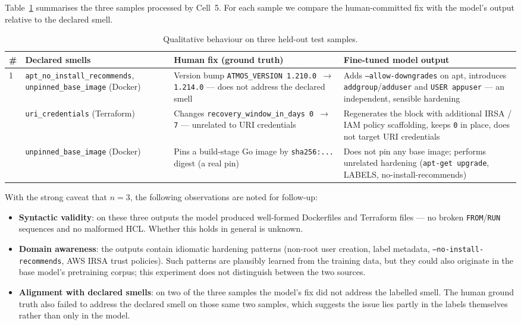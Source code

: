 \documentclass[12pt, a4paper]{report}
\begin{document}
Table~\ref{tab:qualitative} summarises the three samples processed by
Cell~5. For each sample we compare the human-committed fix with the
model's output relative to the declared smell.

\begin{table}[H]
  \centering
  \caption{Qualitative behaviour on three held-out test samples.}
  \label{tab:qualitative}
  \footnotesize
  \begin{tabular}{p{0.5cm}p{2.4cm}p{4.2cm}p{4.5cm}}
    \toprule
    \textbf{\#} & \textbf{Declared smells} & \textbf{Human fix (ground truth)} & \textbf{Fine-tuned model output} \\
    \midrule
    1 & \texttt{apt\_no\_install\_recommends}, \texttt{unpinned\_base\_image} (Docker)
      & Version bump \texttt{ATMOS\_VERSION 1.210.0 $\to$ 1.214.0} --- does not address the declared smell
      & Adds \texttt{--allow-downgrades} on apt, introduces \texttt{addgroup}/\texttt{adduser} and \texttt{USER appuser} --- an independent, sensible hardening \\
    \addlinespace[3pt]
    2 & \texttt{uri\_credentials} (Terraform)
      & Changes \texttt{recovery\_window\_in\_days 0 $\to$ 7} --- unrelated to URI credentials
      & Regenerates the block with additional IRSA / IAM policy scaffolding, keeps \texttt{0} in place, does not target URI credentials \\
    \addlinespace[3pt]
    3 & \texttt{unpinned\_base\_image} (Docker)
      & Pins a build-stage Go image by \texttt{sha256:...} digest (a real pin)
      & Does not pin any base image; performs unrelated hardening (\texttt{apt-get upgrade}, LABELS, no-install-recommends) \\
    \bottomrule
  \end{tabular}
\end{table}

With the strong caveat that \(n=3\), the following observations are
noted for follow-up:

\begin{itemize}
  \item \textbf{Syntactic validity}: on these three outputs the model
        produced well-formed Dockerfiles and Terraform files ---
        no broken \texttt{FROM}/\texttt{RUN} sequences and no malformed
        HCL. Whether this holds in general is unknown.
  \item \textbf{Domain awareness}: the outputs contain idiomatic
        hardening patterns (non-root user creation, label metadata,
        \texttt{--no-install-recommends}, AWS IRSA trust policies).
        Such patterns are plausibly learned from the training data,
        but they could also originate in the base model's pretraining
        corpus; this experiment does not distinguish between the two
        sources.
  \item \textbf{Alignment with declared smells}: on two of the three
        samples the model's fix did not address the labelled smell. The
        human ground truth also failed to address the declared smell on
        those same two samples, which suggests the issue lies partly in
        the labels themselves rather than only in the model.
\end{itemize}
\end{document}
